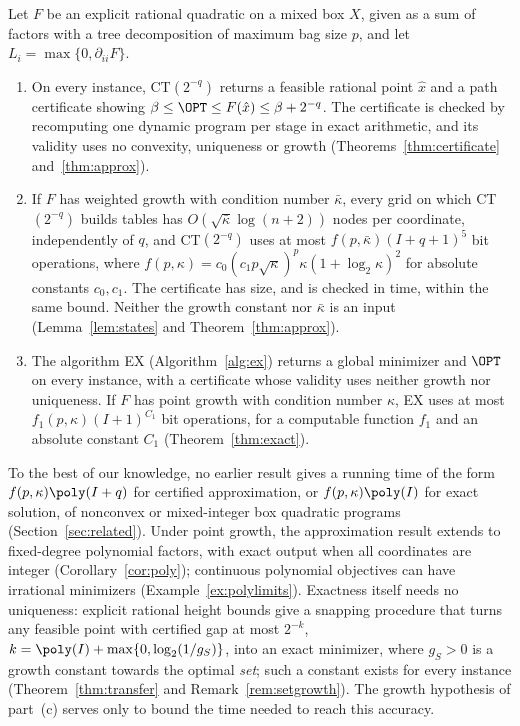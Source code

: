 \begin{theorem}\label{thm:intro-main}
Let $F$ be an explicit rational quadratic on a mixed box $X$, given as a sum
of factors with a tree decomposition of maximum bag size $p$, and let
$L_i=\max\{0,\partial_{ii}F\}$.
\begin{enumerate}[label=(\alph*)]
\item On every instance, CT$(2^{-q})$ returns a feasible rational point $\hat
x$ and a path certificate showing $\beta\le\OPT\le F(\hat x)\le\beta+2^{-q}$.
The certificate is checked by recomputing one dynamic program per stage in
exact arithmetic, and its validity uses no convexity, uniqueness or growth
(Theorems~\ref{thm:certificate} and~\ref{thm:approx}).
\item If $F$ has weighted growth with condition number $\bar\kappa$, every grid
on which CT$(2^{-q})$ builds tables has $O(\sqrt{\bar\kappa}\log(n+2))$ nodes per
coordinate, independently of $q$, and CT$(2^{-q})$ uses at most
$f(p,\bar\kappa)(I+q+1)^5$ bit operations, where
$f(p,\kappa)=c_0(c_1p\sqrt\kappa)^p\kappa(1+\log_2\kappa)^2$ for absolute
constants $c_0,c_1$. The certificate has size, and is checked in time, within
the same bound. Neither the growth constant nor $\bar\kappa$ is an input
(Lemma~\ref{lem:states} and Theorem~\ref{thm:approx}).
\item The algorithm EX (Algorithm~\ref{alg:ex}) returns a global minimizer and
$\OPT$ on every instance, with a certificate whose validity uses neither
growth nor uniqueness. If $F$ has point growth with condition number
$\kappa$, EX uses at most $f_1(p,\kappa)(I+1)^{C_1}$ bit operations, for a
computable function $f_1$ and an absolute constant $C_1$
(Theorem~\ref{thm:exact}).
\end{enumerate}
\end{theorem}

To the best of our knowledge, no earlier result gives a running time of the
form $f(p,\kappa)\poly(I+q)$ for certified approximation, or
$f(p,\kappa)\poly(I)$ for exact solution, of nonconvex or mixed-integer box
quadratic programs (Section~\ref{sec:related}). Under point growth, the
approximation result extends to fixed-degree polynomial factors, with exact
output when all coordinates are integer (Corollary~\ref{cor:poly}); continuous polynomial
objectives can have irrational minimizers (Example~\ref{ex:polylimits}).
Exactness itself needs no uniqueness: explicit rational height bounds give a
snapping procedure that turns any feasible point with certified gap at most
$2^{-k}$, $k=\poly(I)+\max\{0,\log_2(1/g_S)\}$, into an exact minimizer,
where $g_S>0$ is a growth constant towards the optimal \emph{set}; such a
constant exists for every instance (Theorem~\ref{thm:transfer} and
Remark~\ref{rem:setgrowth}). The growth hypothesis of part~(c) serves only
to bound the time needed to reach this accuracy.

